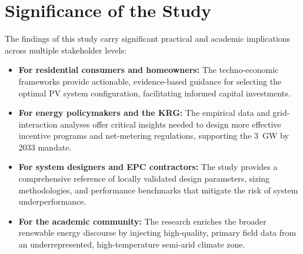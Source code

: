 \section{Significance of the Study}

The findings of this study carry significant practical and academic implications across multiple stakeholder levels:

\begin{itemize}
    \item \textbf{For residential consumers and homeowners:} The techno-economic frameworks provide actionable, evidence-based guidance for selecting the optimal PV system configuration, facilitating informed capital investments.
    \item \textbf{For energy policymakers and the KRG:} The empirical data and grid-interaction analyses offer critical insights needed to design more effective incentive programs and net-metering regulations, supporting the 3~GW by 2033 mandate.
    \item \textbf{For system designers and EPC contractors:} The study provides a comprehensive reference of locally validated design parameters, sizing methodologies, and performance benchmarks that mitigate the risk of system underperformance.
    \item \textbf{For the academic community:} The research enriches the broader renewable energy discourse by injecting high-quality, primary field data from an underrepresented, high-temperature semi-arid climate zone.
\end{itemize}


